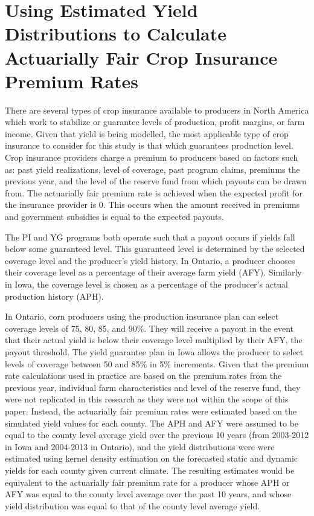 \section{Using Estimated Yield Distributions to Calculate Actuarially Fair Crop Insurance Premium Rates}

There are several types of crop insurance available to producers in North America which work to stabilize or guarantee levels of production, profit margins, or farm income. Given that yield is being modelled, the most applicable type of crop insurance to consider for this study is that which guarantees production level. Crop insurance providers charge a premium to producers based on factors such as: past yield realizations, level of coverage, past program claims, premiums the previous year, and the level of the reserve fund from which payouts can be drawn from. The actuarially fair premium rate is achieved when the expected profit for the insurance provider is 0. This occurs when the amount received in premiums and government subsidies is equal to the expected payouts. 

The PI and YG programs both operate such that a payout occurs if yields fall below some guaranteed level. This guaranteed level is determined by the selected coverage level and the producer's yield history. In Ontario, a producer chooses their coverage level as a percentage of their average farm yield (AFY). Similarly in Iowa, the coverage level is chosen as a percentage of the producer's actual production history (APH).
 
In Ontario, corn producers using the production insurance plan can select coverage levels of 75, 80, 85, and 90\%. They will receive a payout in the event that their actual yield is below their coverage level multiplied by their AFY, the payout threshold. The yield guarantee plan in Iowa allows the producer to select levels of coverage between 50 and 85\% in 5\% increments. Given that the premium rate calculations used in practice are based on the premium rates from the previous year, individual farm characteristics and level of the reserve fund, they were not replicated in this research as they were not within the scope of this paper. Instead, the actuarially fair premium rates were estimated based on the simulated yield values for each county. The APH and AFY were assumed to be equal to the county level average yield over the previous 10 years (from 2003-2012 in Iowa and 2004-2013 in Ontario), and the yield distributions were were estimated using kernel density estimation on the forecasted static and dynamic yields for each county given current climate. The resulting estimates would be equivalent to the actuarially fair premium rate for a producer whose APH or AFY was equal to the county level average over the past 10 years, and whose yield distribution was equal to that of the county level average yield. 

